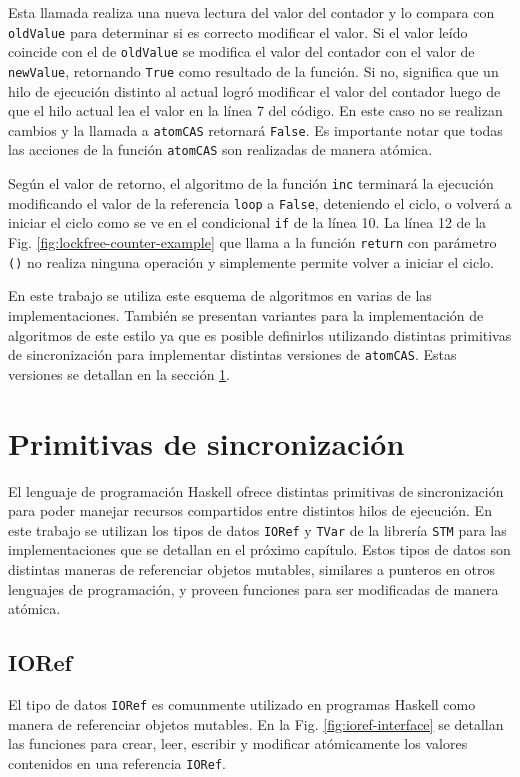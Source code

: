 Esta llamada realiza una nueva lectura del valor del contador y lo compara con \texttt{oldValue} para determinar si es correcto modificar el valor.
Si el valor leído coincide con el de \texttt{oldValue} se modifica el valor del contador con el valor de \texttt{newValue}, retornando \texttt{True} como resultado de la función.
Si no, significa que un hilo de ejecución distinto al actual logró modificar el valor del contador luego de que el hilo actual lea el valor en la línea 7 del código.
En este caso no se realizan cambios y la llamada a \texttt{atomCAS} retornará \texttt{False}.
Es importante notar que todas las acciones de la función \texttt{atomCAS} son realizadas de manera atómica.

Según el valor de retorno, el algoritmo de la función \texttt{inc} terminará la ejecución modificando el valor de la referencia \texttt{loop} a \texttt{False}, deteniendo el ciclo, o volverá a iniciar el ciclo como se ve en el condicional \texttt{if} de la línea 10.
La línea 12 de la Fig. \ref{fig:lockfree-counter-example} que llama a la función \texttt{return} con parámetro \texttt{()} no realiza ninguna operación y simplemente permite volver a iniciar el ciclo.

En este trabajo se utiliza este esquema de algoritmos en varias de las implementaciones. También se presentan variantes para la implementación de algoritmos de este estilo ya que es posible definirlos utilizando distintas primitivas de sincronización para implementar distintas versiones de \texttt{atomCAS}.
Estas versiones se detallan en la sección \ref{sec:primitives}.

\section{Primitivas de sincronización} \label{sec:primitives}
El lenguaje de programación Haskell ofrece distintas primitivas de sincronización para poder manejar recursos compartidos entre distintos hilos de ejecución.
En este trabajo se utilizan los tipos de datos \texttt{IORef} y \texttt{TVar} de la librería \texttt{STM} para las implementaciones que se detallan en el próximo capítulo.
Estos tipos de datos son distintas maneras de referenciar objetos mutables, similares a punteros en otros lenguajes de programación, y proveen funciones para ser modificadas de manera atómica.

\subsection{IORef}\label{sub:ioref}
El tipo de datos \texttt{IORef} es comunmente utilizado en programas Haskell como manera de referenciar objetos mutables.
En la Fig. \ref{fig:ioref-interface} se detallan las funciones para crear, leer, escribir y modificar atómicamente los valores contenidos en una referencia \texttt{IORef}.


